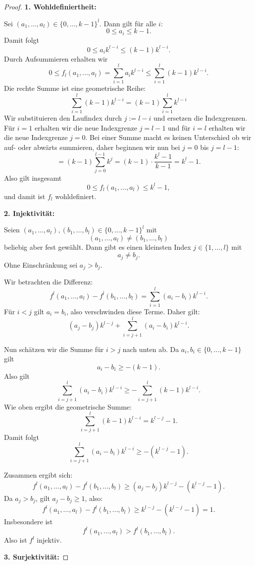 \documentclass{article}
\begin{document}
\begin{proof}
    

\textbf{1. Wohldefiniertheit:}

Sei $(a_1,\dots,a_l) \in \{0,\dots,k-1\}^l$. Dann gilt für alle $i$:
\[
0 \le a_i \le k-1.
\]
Damit folgt
\[
0 \le a_i k^{l-i} \le (k-1)k^{l-i}.
\]
Durch Aufsummieren erhalten wir
\[
0 \le f_l(a_1,\dots,a_l) = \sum_{i=1}^l a_i k^{l-i}
\le \sum_{i=1}^l (k-1)k^{l-i}.
\]
Die rechte Summe ist eine geometrische Reihe: 
\[
\sum_{i=1}^l (k-1)k^{l-i}
= (k-1)\sum_{i=1}^l{k^{l-i}}
\]
Wir substituieren den Laufindex durch $j:=l-i$ und ersetzen die Indexgrenzen. Für $i=1$ erhalten wir die neue Indexgrenze $j=l-1$ und für $i=l$ erhalten wir die neue Indexgrenze $j=0$. Bei einer Summe macht es keinen Unterschied ob wir auf- oder abwärts summieren, daher beginnen wir nun bei $j=0$ bis $j=l-1$:
\[
= (k-1)\sum_{j=0}^{l-1} k^j
= (k-1)\cdot \frac{k^l - 1}{k-1}
= k^l - 1.
\]
Also gilt insgesamt
\[
0 \le f_l(a_1,\dots,a_l) \le k^l - 1,
\]
und damit ist $f_l$ wohldefiniert.

\vspace{0.5em}
\textbf{2. Injektivität:}

Seien $(a_1,\dots,a_l),(b_1,\dots,b_l) \in \{0,\dots,k-1\}^l$ mit
\[
(a_1,\dots,a_l) \ne (b_1,\dots,b_l)
\] 
beliebig aber fest gewählt.
Dann gibt es einen kleinsten Index $j \in \{1,\dots,l\}$ mit
\[
a_j \ne b_j.
\]
Ohne Einschränkung sei $a_j > b_j$.

Wir betrachten die Differenz:
\[
f^l(a_1,\dots,a_l) - f^l(b_1,\dots,b_l)
= \sum_{i=1}^l (a_i - b_i)k^{l-i}.
\]
Für $i<j$ gilt $a_i = b_i$, also verschwinden diese Terme. Daher gilt:
\[
(a_j - b_j)k^{l-j} + \sum_{i=j+1}^l (a_i - b_i)k^{l-i}.
\]

Nun schätzen wir die Summe für $i>j$ nach unten ab. Da $a_i,b_i \in \{0,\dots,k-1\}$ gilt
\[
a_i - b_i \ge -(k-1).
\]
Also gilt
\[
\sum_{i=j+1}^l (a_i - b_i)k^{l-i}
\ge -\sum_{i=j+1}^l (k-1)k^{l-i}.
\]
Wie oben ergibt die geometrische Summe:
\[
\sum_{i=j+1}^l (k-1)k^{l-i}
= k^{l-j} - 1.
\]
Damit folgt
\[
\sum_{i=j+1}^l (a_i - b_i)k^{l-i}
\ge -(k^{l-j} - 1).
\]

Zusammen ergibt sich:
\[
f^l(a_1,\dots,a_l) - f^l(b_1,\dots,b_l)
\ge (a_j - b_j)k^{l-j} - (k^{l-j} - 1).
\]
Da $a_j > b_j$, gilt $a_j - b_j \ge 1$, also:
\[
f^l(a_1,\dots,a_l) - f^l(b_1,\dots,b_l)
\ge k^{l-j} - (k^{l-j} - 1) = 1.
\]
Insbesondere ist
\[
f^l(a_1,\dots,a_l) > f^l(b_1,\dots,b_l).
\]
Also ist $f^l$ injektiv.

\vspace{0.5em}
\textbf{3. Surjektivität:}


\end{proof}
\end{document}

